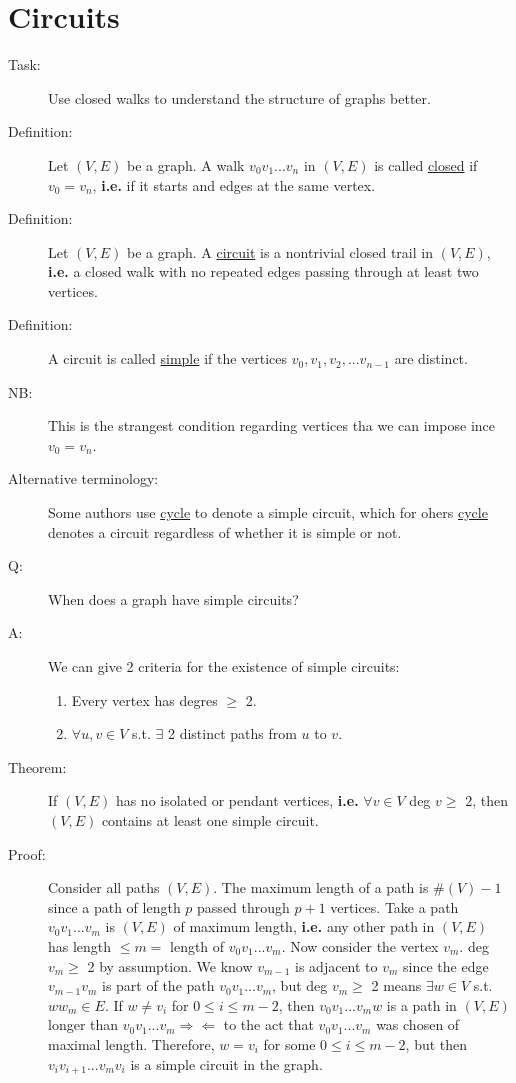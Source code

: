 \documentclass[10pt]{article}
\begin{document}
	\section{Circuits}
	\begin{description}
		\item[Task:] Use closed walks to understand the structure of graphs better.
		\item[Definition:] Let $(V, E)$ be a graph. A walk $v_0 v_1 ... v_n$ in $(V, E)$ is called \underline{closed} if $v_0 = v_n$, \textbf{i.e.} if it starts and edges at the same vertex.
		\item[Definition:] Let $(V, E)$ be a graph. A \underline{circuit} is a nontrivial closed trail in $(V, E)$, \textbf{i.e.} a closed walk with no repeated edges passing through at least two vertices.
		\item[Definition:] A circuit is called \underline{simple} if the vertices $v_0, v_1, v_2, ... v_{n-1}$ are distinct.
		\item[NB:] This is the strangest condition regarding vertices tha we can impose ince $v_0 = v_n$.
		\item[Alternative terminology:] Some authors use \underline{cycle} to denote a simple circuit, which for ohers \underline{cycle} denotes a circuit regardless of whether it is simple or not.
		\item[Q:] When does a graph have simple circuits?
		\item[A:] We can give 2 criteria for the existence of simple circuits:
		\begin{enumerate}
			\item Every vertex has degres $\geq$ 2.
			\item $\forall u, v \in V$ s.t. $\exists$ 2 distinct paths from $u$ to $v$.
		\end{enumerate}
		\item[Theorem:] If $(V, E)$ has no isolated or pendant vertices, \textbf{i.e.} $\forall v \in V$ deg $v \geq$ 2, then $(V, E)$ contains at least one simple circuit.
		\item[Proof:] Consider all paths $(V, E)$. The maximum length of a path is $\#(V) - 1$ since a path of length $p$ passed through $p+1$ vertices. Take a path $v_0 v_1 ... v_m$ is $(V, E)$ of maximum length, \textbf{i.e.} any other path in $(V, E)$ has length $\leq m = $ length of $v_0 v_1 ... v_m$. Now consider the vertex $v_m$. deg $v_m \geq$ 2 by assumption. We know $v_{m-1}$ is adjacent to $v_m$ since the edge $v_{m-1} v_m$ is part of the path $v_0 v_1 ... v_m$, but deg $v_m \geq $ 2 means $\exists w \in V$ s.t. $ww_m \in E$. If $w \neq v_i$ for $0 \leq i \leq m-2$, then $v_0 v_1 ... v_m w$ is a path in $(V, E)$ longer than $v_0 v_1 ... v_m \Rightarrow \Leftarrow$ to the act that $v_0 v_1 ... v_m$ was chosen of maximal length. Therefore, $w = v_i$ for some $0 \leq i \leq m-2$, but then $v_i v_{i+1} ... v_m v_i$ is a simple circuit in the graph.

\end{description}
\end{document}

